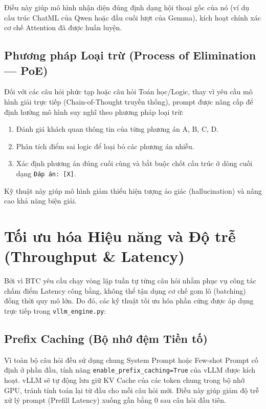 \documentclass[12pt,a4paper]{article}
\begin{document}
Điều này giúp mô hình nhận diện đúng định dạng hội thoại gốc của nó
(ví dụ cấu trúc ChatML của Qwen hoặc đầu cuối lượt của Gemma),
kích hoạt chính xác cơ chế Attention đã được huấn luyện.

\subsection{Phương pháp Loại trừ (Process of Elimination --- PoE)}

Đối với các câu hỏi phức tạp hoặc câu hỏi Toán học/Logic, thay vì yêu cầu
mô hình giải trực tiếp (Chain-of-Thought truyền thống), prompt được nâng cấp
để định hướng mô hình suy nghĩ theo phương pháp loại trừ:
\begin{enumerate}
    \item Đánh giá khách quan thông tin của từng phương án A, B, C, D.
    \item Phân tích điểm sai logic để loại bỏ các phương án nhiễu.
    \item Xác định phương án đúng cuối cùng và bắt buộc chốt cấu trúc
          ở dòng cuối dạng \texttt{Đáp án: [X]}.
\end{enumerate}
Kỹ thuật này giúp mô hình giảm thiểu hiện tượng ảo giác (hallucination)
và nâng cao khả năng biện giải.

\section{Tối ưu hóa Hiệu năng và Độ trễ (Throughput \& Latency)}

Bởi vì BTC yêu cầu chạy vòng lặp tuần tự từng câu hỏi nhằm phục vụ
công tác chấm điểm Latency công bằng, không thể tận dụng cơ chế gom lô
(batching) đồng thời quy mô lớn. Do đó, các kỹ thuật tối ưu hóa phần cứng
được áp dụng trực tiếp trong \texttt{vllm\_engine.py}:

\subsection{Prefix Caching (Bộ nhớ đệm Tiền tố)}

Vì toàn bộ câu hỏi đều sử dụng chung System Prompt hoặc Few-shot Prompt
cố định ở phần đầu, tính năng \texttt{enable\_prefix\_caching=True} của
vLLM được kích hoạt. vLLM sẽ tự động lưu giữ KV Cache của các token chung
trong bộ nhớ GPU, tránh tính toán lại từ đầu cho mỗi câu hỏi mới.
Điều này giúp giảm độ trễ xử lý prompt (Prefill Latency) xuống gần bằng 0
sau câu hỏi đầu tiên.
\end{document}
